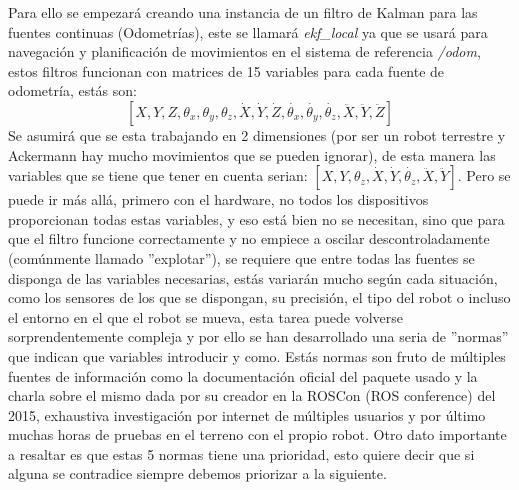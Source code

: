 Para ello se empezará creando una instancia de un filtro de Kalman para las fuentes continuas (Odometrías), este se llamará 
\textit{ekf\_local} ya que se usará para navegación y planificación de movimientos en el sistema de referencia \textit{/odom}, estos 
filtros funcionan con matrices de 15 variables para cada fuente de odometría, estás son: 
$$[ X,Y,Z,\theta_{x},\theta_{y},\theta_{z},\dot{X},\dot{Y},\dot{Z},\dot{\theta_{x}},\dot{\theta_{y}},\dot{\theta_{z}},\ddot{X},\ddot{Y},\ddot{Z} ]$$
Se asumirá que se esta trabajando en 2 dimensiones (por ser un robot terrestre y Ackermann hay mucho movimientos que se pueden 
ignorar), de esta manera las variables que se tiene que tener en cuenta serian: 
$[ X,Y,\theta_{z},\dot{X},\dot{Y},\dot{\theta_{z}},\ddot{X},\ddot{Y}]$. Pero se puede ir más allá, primero con el hardware, no todos los dispositivos proporcionan todas estas variables, y eso está bien no se necesitan, sino que para que 
el filtro funcione correctamente y no empiece a oscilar descontroladamente (comúnmente llamado ''explotar''), se requiere que entre 
todas las fuentes
se disponga de las variables necesarias, estás variarán mucho según cada situación, como los sensores de los que se dispongan, su precisión, el 
tipo del robot o incluso el entorno en el que el robot se mueva, esta tarea puede volverse sorprendentemente compleja
y por ello se han desarrollado una seria de ''normas'' que indican que variables introducir y como. Estás normas son fruto de múltiples 
fuentes de información como la documentación oficial del paquete usado y la charla sobre el mismo dada por su creador en la ROSCon 
(ROS conference) del 2015, exhaustiva investigación por internet de múltiples usuarios y por último muchas horas de pruebas en el terreno 
con el propio robot. Otro dato importante a resaltar es que estas 5 normas tiene una prioridad, esto quiere decir que si alguna se 
contradice siempre debemos priorizar a la siguiente.  

